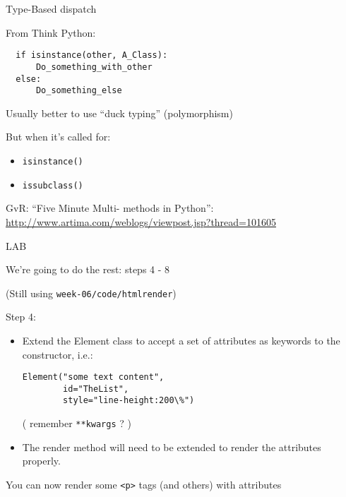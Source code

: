 \documentclass{beamer}
\begin{document}
\begin{frame}[fragile]{Type-Based dispatch}

{\Large From Think Python:}

\begin{verbatim}
  if isinstance(other, A_Class):
      Do_something_with_other
  else:
      Do_something_else
\end{verbatim}

\vfill
{\Large Usually better to use ``duck typing'' (polymorphism)}

\vfill
{\Large But when it's called for:}
\begin{itemize}
    \item \verb|isinstance()|
    \item \verb|issubclass()|
\end{itemize}

\vfill
GvR: ``Five Minute Multi- methods in Python'':\\
{\small \url{http://www.artima.com/weblogs/viewpost.jsp?thread=101605} }

\end{frame} 

\begin{frame}[fragile]{LAB}

{\Large We're going to do the rest: steps 4 - 8}

{(Still using \verb|week-06/code/htmlrender|) }

\vfill
{\Large Step 4:}

\begin{itemize}
  \item Extend the Element class to accept a set of attributes as keywords to the
  constructor, i.e.:
  \begin{verbatim}
Element("some text content",
        id="TheList",
        style="line-height:200\%")
  \end{verbatim}
    ( remember \verb|**kwargs| ? )
  \item The render method will need to be extended to render the attributes properly.
\end{itemize}

\vfill
You can now render some \verb|<p>| tags (and others) with attributes  
\end{frame}
\end{document}
